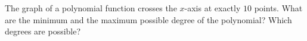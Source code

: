 The graph of a polynomial function crosses the $x$-axis at exactly $10$ points. What are the minimum and the maximum possible degree of the polynomial? Which degrees are possible?
